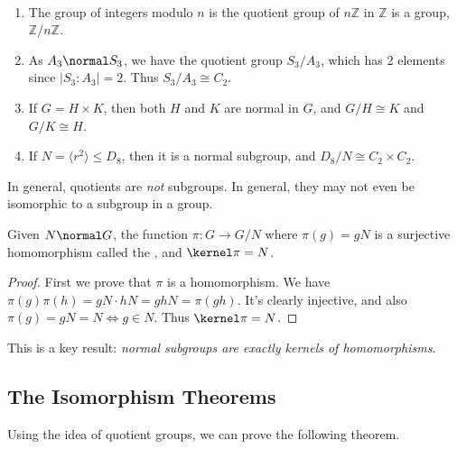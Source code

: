\documentclass[a4paper]{scrartcl}
\begin{document}
\begin{example}~
	    \vspace*{-1.5\baselineskip}
	\begin{enumerate}[label=(\roman*)]
		\item The group of integers modulo $n$ is the quotient group of $n\mathbb{Z}$ in $\mathbb{Z}$ is a group, $\mathbb{Z}/n\mathbb{Z}$.
		\item As $A_3 \normal S_3$, we have the quotient group $S_3/A_3$, which has 2 elements since $|S_3 : A_3| = 2$. Thus $S_3 / A_3 \cong C_2$.
		\item If $G = H \times K$, then both $H$ and $K$ are normal in $G$, and $G/H \cong K$ and $G/K \cong H$.
		\item If $N = \langle r^2 \rangle \leq D_8$, then it is a normal subgroup, and $D_8/N \cong C_2 \times C_2$. 
	\end{enumerate}
\end{example}

\begin{remark}
	In general, quotients are \emph{not} subgroups. In general, they may not even be isomorphic to a subgroup in a group.
\end{remark}

\begin{theorem}
	Given $N \normal G$, the function $\pi : G \rightarrow G/N$ where $\pi(g) = gN$ is a surjective homomorphism called the , and $\kernel \pi = N$.
\end{theorem}
\begin{proof}
	First we prove that $\pi$ is a homomorphism. We have $\pi(g)\pi(h) = gN \cdot hN = gh N = \pi(gh)$. It's clearly injective, and also $\pi(g)= gN = N \iff g \in N$. Thus $\kernel \pi = N$.
\end{proof}

This is a key result: \emph{normal subgroups are exactly kernels of homomorphisms}.

\subsection{The Isomorphism Theorems}

Using the idea of quotient groups, we can prove the following theorem.
\end{document}
